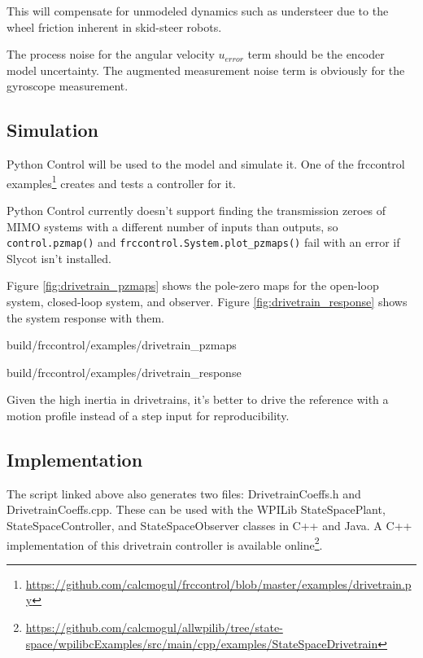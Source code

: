 This will compensate for unmodeled dynamics such as understeer due to the wheel
friction inherent in skid-steer robots.

\begin{remark}
  The process noise for the angular velocity $u_{error}$ term should be the
  encoder \gls{model} uncertainty. The augmented measurement noise term is
  obviously for the gyroscope measurement.
\end{remark}

\subsection{Simulation}

Python Control will be used to  the
\gls{model} and simulate it. One of the frccontrol
examples\footnote{\url{https://github.com/calcmogul/frccontrol/blob/master/examples/drivetrain.py}}
creates and tests a controller for it.

\begin{remark}
  Python Control currently doesn't support finding the transmission zeroes of
  MIMO \glspl{system} with a different number of \glspl{input} than
  \glspl{output}, so \texttt{control.pzmap()} and
  \texttt{frccontrol.System.plot\_pzmaps()} fail with an error if Slycot isn't
  installed.
\end{remark}

Figure \ref{fig:drivetrain_pzmaps} shows the pole-zero maps for the open-loop
\gls{system}, closed-loop \gls{system}, and \gls{observer}. Figure
\ref{fig:drivetrain_response} shows the \gls{system} response with them.

\begin{svg}{build/frccontrol/examples/drivetrain_pzmaps}
  \caption{Drivetrain pole-zero maps}
  \label{fig:drivetrain_pzmaps}
\end{svg}

\begin{svg}{build/frccontrol/examples/drivetrain_response}
  \caption{Drivetrain response}
  \label{fig:drivetrain_response}
\end{svg}

Given the high inertia in drivetrains, it's better to drive the \gls{reference}
with a motion profile instead of a \gls{step input} for reproducibility.

\subsection{Implementation}

The script linked above also generates two files: DrivetrainCoeffs.h and
DrivetrainCoeffs.cpp. These can be used with the WPILib StateSpacePlant,
StateSpaceController, and StateSpaceObserver classes in C++ and Java. A C++
implementation of this drivetrain controller is available online\footnote{
\url{https://github.com/calcmogul/allwpilib/tree/state-space/wpilibcExamples/src/main/cpp/examples/StateSpaceDrivetrain}}.
